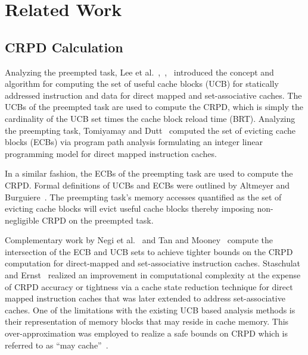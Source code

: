 \section{Related Work}\label{sec:related}

\subsection {CRPD Calculation}\label{sec:crpd_related_work}
Analyzing the preempted task, Lee et al.~\cite{lee:96},~\cite{lee:97},~\cite{lee:98} introduced the concept and algorithm for computing the set of useful cache blocks (UCB) for statically addressed instruction and data for direct mapped and set-associative caches.
The UCBs of the preempted task are used to compute the CRPD, which is simply the cardinality of the UCB set times the cache block reload time (BRT).
\newline
\indent
Analyzing the preempting task, Tomiyamay and Dutt~\cite{tomiyamay:00} computed the set of evicting cache blocks (ECBs) via program path analysis formulating an integer linear programming model for direct mapped instruction caches.

In a similar fashion, the ECBs of the preempting task are used to compute the CRPD.
Formal definitions of UCBs and ECBs were outlined by Altmeyer and Burguiere~\cite{altmeyer:11c}.  The preempting task’s memory accesses quantified as the set of evicting cache blocks will evict useful cache blocks thereby imposing non-negligible CRPD on the preempted task.

Complementary work by Negi et al.~\cite{negi:03} and Tan and Mooney~\cite{tan:04} compute the intersection of the ECB and UCB sets to achieve tighter bounds on the CRPD computation for direct-mapped and set-associative instruction caches.
Staschulat and Ernst~\cite{staschulat:05c} realized an improvement in computational complexity at the expense of CRPD accuracy or tightness via a cache state reduction technique for direct mapped instruction caches that was later extended to address set-associative caches.
One of the limitations with the existing UCB based analysis methods is their representation of memory blocks that may reside in cache memory.  This over-approximation was employed to realize a safe bounds on CRPD which is referred to as “may cache”~\cite{altmeyer:11c}.

